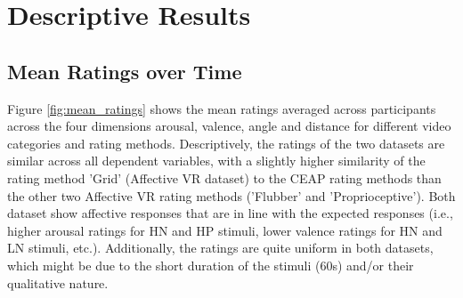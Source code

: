 \documentclass[11pt, letterpaper]{article}
\begin{document}
\section{Descriptive Results} \label{results}

\subsection{Mean Ratings over Time}
Figure \ref{fig:mean_ratings} shows the mean ratings averaged across participants across the four dimensions arousal, valence, angle and distance for different video categories and rating methods. Descriptively, the ratings of the two datasets are similar across all dependent variables, with a slightly higher similarity of the rating method 'Grid' (Affective VR dataset) to the CEAP rating methods than the other two Affective VR rating methods ('Flubber' and 'Proprioceptive'). Both dataset show affective responses that are in line with the expected responses (i.e., higher arousal ratings for HN and HP stimuli, lower valence ratings for HN and LN stimuli, etc.). Additionally, the ratings are quite uniform in both datasets, which might be due to the short duration of the stimuli (60s) and/or their qualitative nature.
\end{document}
